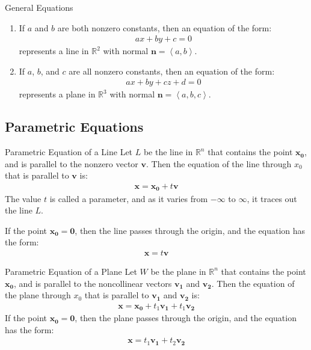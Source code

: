 \documentclass[\main/notes.tex]{subfiles}
\begin{document}
				\begin{theorem}{General Equations}
					\begin{enumerate}[label=(\alph*)]
						\item If $a$ and $b$ are both nonzero constants, then an equation of the form:
							\begin{align*}
								ax + by + c = 0
							\end{align*}
							represents a line in $\mathbb{R}^{2}$ with normal $\mathbf{n} = \left\langle a, b\right\rangle$.
						\item If $a$, $b$, and $c$ are all nonzero constants, then an equation of the form:
							\begin{align*}
								ax + by + cz + d = 0
							\end{align*}
							represents a plane in $\mathbb{R}^{3}$ with normal $\mathbf{n} = \left\langle a, b, c\right\rangle$.
					\end{enumerate}
				\end{theorem}
			\subsection{Parametric Equations}
				\begin{definition}{Parametric Equation of a Line}
					Let $L$ be the line in $\mathbb{R}^{n}$ that contains the point $\mathbf{x_{0}}$, and is parallel to the nonzero vector $\mathbf{v}$. Then the equation of the line through $x_{0}$ that is parallel to $\mathbf{v}$ is:
					\begin{align*}
						\mathbf{x} = \mathbf{x_{0}} + t\mathbf{v}
					\end{align*}
					The value $t$ is called a parameter, and as it varies from $-\infty$ to $\infty$, it traces out the line $L$.

					If the point $\mathbf{x_{0}} = \mathbf{0}$, then the line passes through the origin, and the equation has the form:
					\begin{align*}
						\mathbf{x} = t\mathbf{v}
					\end{align*}
				\end{definition}
				\begin{definition}{Parametric Equation of a Plane}
					Let $W$ be the plane in $\mathbb{R}^{n}$ that contains the point $\mathbf{x_{0}}$, and is parallel to the noncollinear vectors $\mathbf{v_{1}}$ and $\mathbf{v_{2}}$. Then the equation of the plane through $x_{0}$ that is parallel to $\mathbf{v_{1}}$ and $\mathbf{v_{2}}$ is:
					\begin{align*}
						\mathbf{x} = \mathbf{x_{0}} + t_{1}\mathbf{v_{1}} + t_{1}\mathbf{v_{2}}
					\end{align*}
					If the point $\mathbf{x_{0}} = \mathbf{0}$, then the plane passes through the origin, and the equation has the form:
					\begin{align*}
						\mathbf{x} = t_{1}\mathbf{v_{1}} + t_{2}\mathbf{v_{2}}
					\end{align*}
				\end{definition}
\end{document}
